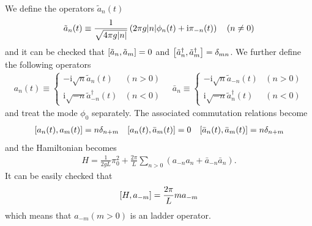 \documentclass[10pt]{article}
\newcommand{\ii}{\mathrm{i}}
\begin{document}
We define the operators $\tilde{a}_n(t)$
\begin{align}
    \tilde{a}_n(t)\equiv\frac{1}{\sqrt{4\pi g\abs{n}}}\left(2\pi g\abs{n}\phi_n(t)+\ii\pi_{-n}(t)\right)\quad(n\neq0)\label{eq:operator:boson:origin_ladder}
\end{align}
and it can be checked that $\comm{\tilde{a}_n}{\tilde{a}_m}=0$ and $\comm{\tilde{a}_n^\dagger}{\tilde{a}_m^\dagger}=\delta_{mn}$.
We further define the following operators
\begin{align}
    a_n(t)\equiv\begin{cases}
                    -\ii\sqrt{n}\tilde{a}_n(t)            & (n>0) \\
                    \ii\sqrt{-n}\tilde{a}^\dagger_{-n}(t) & (n<0)
                \end{cases}
    \quad
    \bar{a}_n\equiv\begin{cases}
                       -\ii \sqrt{n}\tilde{a}_{-n}(t)      & (n>0) \\
                       \ii \sqrt{-n}\tilde{a}_n^\dagger(t) & (n<0)
                   \end{cases}\label{eq:operator:boson:new_ladder}
\end{align}
and treat the mode $\phi_0$ separately.
The associated commutation relations become
\begin{align}
    \comm{a_n(t)}{a_m(t)}=n\delta_{n+m}\quad\comm{a_n(t)}{\bar{a}_m(t)}=0\quad\comm{\bar{a}_n(t)}{\bar{a}_m(t)}=n\delta_{n+m}
\end{align}
and the Hamiltonian becomes
\begin{align}\label{eq:operator:boson:H_ladder}
    H=\frac{1}{2gL}\pi_0^2+\frac{2\pi}{L}\sum_{n>0}\left(a_{-n}a_n+\bar{a}_{-n}\bar{a}_n\right).
\end{align}
It can be easily checked that
\begin{align}
    \comm{H}{a_{-m}}=\frac{2\pi}{L}ma_{-m}
\end{align}
which means that $a_{-m} (m>0)$ is an ladder operator.
\end{document}
